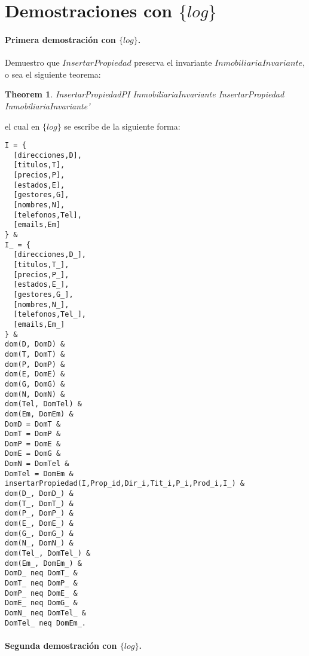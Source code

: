\documentclass[12pt]{article}
\newtheorem{theorem}{Theorem}
\newcommand{\setlog}{$\{log\}$\xspace}
\begin{document}
\section{Demostraciones con \setlog}

\paragraph{Primera demostración con \setlog.}

Demuestro que $InsertarPropiedad$ preserva el invariante $InmobiliariaInvariante$, o sea el siguiente teorema:
\begin{theorem}{InsertarPropiedadPI}
InmobiliariaInvariante \land InsertarPropiedad \implies InmobiliariaInvariante'
\end{theorem}
el cual en \setlog se escribe de la siguiente forma:
\begin{verbatim}
I = {
  [direcciones,D],
  [titulos,T],
  [precios,P],
  [estados,E],
  [gestores,G],
  [nombres,N],
  [telefonos,Tel],
  [emails,Em]
} &
I_ = {
  [direcciones,D_],
  [titulos,T_],
  [precios,P_],
  [estados,E_],
  [gestores,G_],
  [nombres,N_],
  [telefonos,Tel_],
  [emails,Em_]
} &
dom(D, DomD) &  
dom(T, DomT) &  
dom(P, DomP) &  
dom(E, DomE) &  
dom(G, DomG) &  
dom(N, DomN) &  
dom(Tel, DomTel) &  
dom(Em, DomEm) &
DomD = DomT &
DomT = DomP &
DomP = DomE &
DomE = DomG &
DomN = DomTel &
DomTel = DomEm &
insertarPropiedad(I,Prop_id,Dir_i,Tit_i,P_i,Prod_i,I_) &
dom(D_, DomD_) &  
dom(T_, DomT_) &  
dom(P_, DomP_) &  
dom(E_, DomE_) &  
dom(G_, DomG_) &  
dom(N_, DomN_) &  
dom(Tel_, DomTel_) &  
dom(Em_, DomEm_) &
DomD_ neq DomT_ &
DomT_ neq DomP_ &
DomP_ neq DomE_ &
DomE_ neq DomG_ &
DomN_ neq DomTel_ &
DomTel_ neq DomEm_.
\end{verbatim}

\newpage

\paragraph{Segunda demostración con \setlog.}
\end{document}
